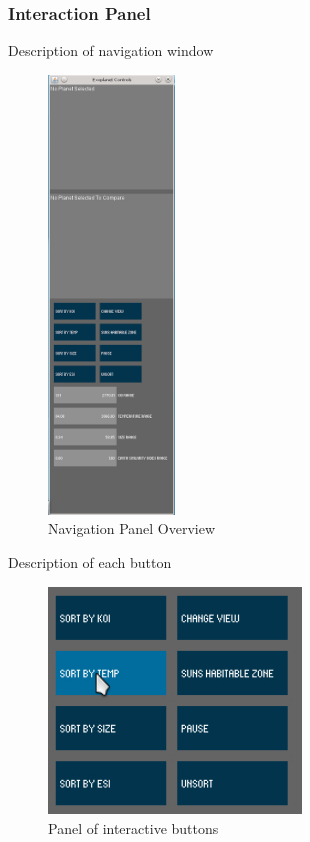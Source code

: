 \subsubsection{Interaction Panel}
Description of navigation window
\begin{figure}[H]
  \centering
      \includegraphics[width=0.3\textwidth]{images/nav.png}
  \caption{Navigation Panel Overview}
  \label{fig:nav}
\end{figure}
Description of each button
\begin{figure}[H]
  \centering
      \includegraphics[width=0.6\textwidth]{images/buttons.jpg}
  \caption{Panel of interactive buttons}
  \label{fig:buttons}
\end{figure}
